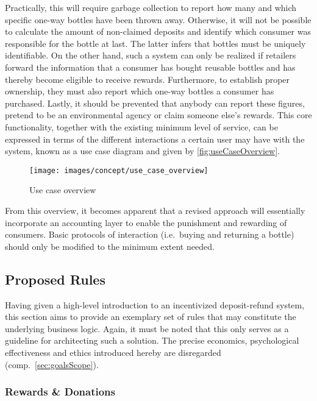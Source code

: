 Practically, this will require garbage collection to report how many and which specific one-way bottles have been thrown away. Otherwise, it will not be possible to calculate the amount of non-claimed deposits and identify which consumer was responsible for the bottle at last. The latter infers that bottles must be uniquely identifiable. On the other hand, such a system can only be realized if retailers forward the information that a consumer has bought reusable bottles and has thereby become eligible to receive rewards. Furthermore, to establish proper ownership, they must also report which one-way bottles a consumer has purchased. Lastly, it should be prevented that anybody can report these figures, pretend to be an environmental agency or claim someone else's rewards. This core functionality, together with the existing minimum level of service, can be expressed in terms of the different interactions a certain user may have with the system, known as a use case diagram and given by \autoref{fig:useCaseOverview}.

\begin{figure}[hbt]
  \texttt{[image: images/concept/use\_case\_overview]}
  \caption{Use case overview}
  \label{fig:useCaseOverview}
\end{figure}

\FloatBarrier

From this overview, it becomes apparent that a revised approach will essentially incorporate an accounting layer to enable the punishment and rewarding of consumers. Basic protocols of interaction (i.e.~buying and returning a bottle) should only be modified to the minimum extent needed.

\subsection{Proposed Rules}
\label{sec:rules}
Having given a high-level introduction to an incentivized deposit-refund system, this section aims to provide an exemplary set of rules that may constitute the underlying business logic. Again, it must be noted that this only serves as a guideline for architecting such a solution. The precise economics, psychological effectiveness and ethics introduced hereby are disregarded (comp.~\ref{sec:goalsScope}).

\subsubsection{Rewards \& Donations}


